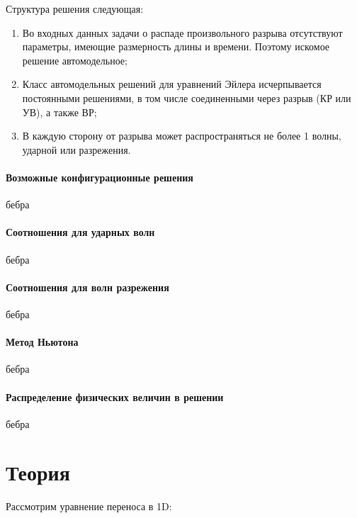 Структура решения следующая:
\begin{enumerate}
	\item Во входных данных задачи о распаде произвольного разрыва отсутствуют параметры, имеющие размерность длины и времени. Поэтому искомое решение автомодельное;
	\item Класс автомодельных решений для уравнений Эйлера исчерпывается постоянными решениями, в том числе соединенными через разрыв (КР или УВ), а также ВР;
	\item В каждую сторону от разрыва может распространяться не более 1 волны, ударной или разрежения.
\end{enumerate}

\subsection{Возможные конфигурационные решения}\label{sect_configs}

бебра

\subsection{Соотношения для ударных волн}\label{sect_sw}

бебра

\subsection{Соотношения для волн разрежения}\label{sect_rw}

бебра

\subsection{Метод Ньютона}\label{sect_MethNewton}

бебра

\subsection{Распределение физических величин в решении}\label{sect_allSolutions}

бебра

\part{Теория}\label{part_theory}

Рассмотрим уравнение переноса в 1D:


